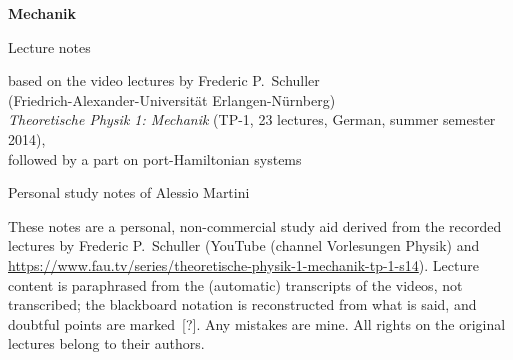 \documentclass[12pt,oneside,openany]{book}
\begin{document}
\frontmatter
\begin{titlepage}
  \centering
  \vspace*{3cm}
  {\Huge\bfseries Mechanik\par}
  \vspace{1cm}
  {\Large Lecture notes\par}
  \vspace{0.5cm}
  {\large based on the video lectures by Frederic P.~Schuller\\
  (Friedrich-Alexander-Universit\"at Erlangen-N\"urnberg)\\
  \emph{Theoretische Physik 1: Mechanik} (TP-1, 23 lectures, German, summer semester 2014),\\followed by a part on port-Hamiltonian systems\par}
  \vspace{2cm}
  {\large Personal study notes of Alessio Martini\par}
  \vfill
  \begin{minipage}{0.85\textwidth}\small
    These notes are a personal, non-commercial study aid derived from the recorded lectures by Frederic P.~Schuller
    (YouTube (channel Vorlesungen Physik) and \url{https://www.fau.tv/series/theoretische-physik-1-mechanik-tp-1-s14}).
    Lecture content is paraphrased from the (automatic) transcripts of the videos, not transcribed;
    the blackboard notation is reconstructed from what is said, and doubtful points are marked~[?].
    Any mistakes are mine. All rights on the original lectures belong to their authors.
  \end{minipage}
  \vspace{1cm}
\end{titlepage}
\end{document}

